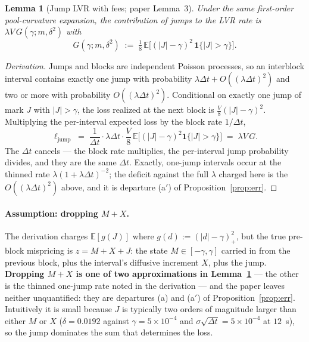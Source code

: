 \documentclass[11pt]{article}
\newtheorem{lemma}{Lemma}
\theoremstyle{definition}
\theoremstyle{remark}
\newcommand{\E}{\mathbb{E}}
\newcommand{\dt}{\Delta t}
\newcommand{\1}{\mathbf{1}}
\begin{document}
\begin{lemma}[Jump LVR with fees; paper Lemma~3]\label{lem:G}
Under the same first-order pool-curvature expansion, the contribution of jumps to the LVR rate is $\lambda V\,G(\gamma;m,\delta^2)$ with
\begin{equation}\label{eq:G}
\boxed{\;G(\gamma;m,\delta^2) \;:=\; \tfrac18\,\E\big[(|J|-\gamma)^2\,\1\{|J|>\gamma\}\big]. \;}
\end{equation}
\end{lemma}

\begin{proof}[Derivation]
Jumps and blocks are independent Poisson processes, so an interblock interval contains exactly one jump with probability $\lambda\dt + O((\lambda\dt)^2)$ and two or more with probability $O((\lambda\dt)^2)$. Conditional on exactly one jump of mark $J$ with $|J| > \gamma$, the loss realized at the next block is $\tfrac{V}{8}(|J|-\gamma)^2$. Multiplying the per-interval expected loss by the block rate $1/\dt$,
\[
\ell_{\mathrm{jump}} \;=\; \frac{1}{\dt}\cdot\lambda\dt\cdot\frac{V}{8}\,\E\big[(|J|-\gamma)^2\1\{|J|>\gamma\}\big] \;=\; \lambda V\,G .
\]
The $\dt$ cancels --- the block rate multiplies, the per-interval jump probability divides, and they are the same $\dt$. Exactly, one-jump intervals occur at the thinned rate $\lambda(1+\lambda\dt)^{-2}$; the deficit against the full $\lambda$ charged here is the $O((\lambda\dt)^2)$ above, and it is departure (a$'$) of Proposition~\ref{prop:err}. \end{proof}

\paragraph{Assumption: dropping $M+X$.}
The derivation charges $\E[g(J)]$ where $g(d) := (|d|-\gamma)_+^2$, but the true pre-block mispricing is $z = M + X + J$: the state $M \in [-\gamma,\gamma]$ carried in from the previous block, plus the interval's diffusive increment $X$, plus the jump. \textbf{Dropping $M + X$ is one of two approximations in Lemma~\ref{lem:G}} --- the other is the thinned one-jump rate noted in the derivation --- and the paper leaves neither unquantified: they are departures (a) and (a$'$) of Proposition~\ref{prop:err}. Intuitively it is small because $J$ is typically two orders of magnitude larger than either $M$ or $X$ ($\delta = 0.0192$ against $\gamma = 5\times10^{-4}$ and $\sigma\sqrt{\dt} = 5\times10^{-4}$ at $12$~s), so the jump dominates the sum that determines the loss.
\end{document}

